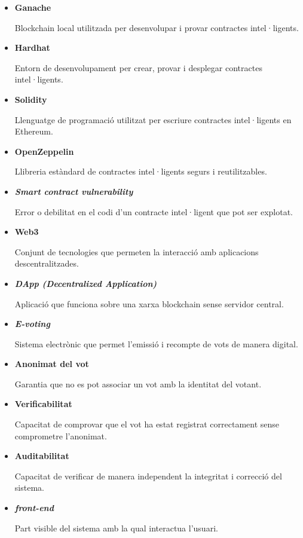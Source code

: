 \begin{itemize}
\item \hypertarget{def:ganache}{\textbf{Ganache}} Blockchain local utilitzada per desenvolupar i provar contractes intel·ligents.

\item \hypertarget{def:hardhat}{\textbf{Hardhat}} Entorn de desenvolupament per crear, provar i desplegar contractes intel·ligents.

\item \hypertarget{def:solidity}{\textbf{Solidity}} Llenguatge de programació utilitzat per escriure contractes intel·ligents en Ethereum.

\item \hypertarget{def:openzeppelin}{\textbf{OpenZeppelin}} Llibreria estàndard de contractes intel·ligents segurs i reutilitzables.

\item \hypertarget{def:vulnerability}{\textbf{\textit{Smart contract vulnerability}}} Error o debilitat en el codi d'un contracte intel·ligent que pot ser explotat.

\item \hypertarget{def:web3}{\textbf{Web3}} Conjunt de tecnologies que permeten la interacció amb aplicacions descentralitzades.

\item \hypertarget{def:dapp}{\textbf{\textit{DApp (Decentralized Application)}}} Aplicació que funciona sobre una xarxa blockchain sense servidor central.

\item \hypertarget{def:evoting}{\textbf{\textit{E-voting}}} Sistema electrònic que permet l'emissió i recompte de vots de manera digital.

\item \hypertarget{def:anonimat}{\textbf{Anonimat del vot}} Garantia que no es pot associar un vot amb la identitat del votant.

\item \hypertarget{def:verificabilitat}{\textbf{Verificabilitat}} Capacitat de comprovar que el vot ha estat registrat correctament sense comprometre l'anonimat.

\item \hypertarget{def:auditabilitat}{\textbf{Auditabilitat}} Capacitat de verificar de manera independent la integritat i correcció del sistema.

\item \hypertarget{def:\textit{front-end}}{\textbf{\textit{front-end}}} Part visible del sistema amb la qual interactua l'usuari.


\end{itemize}
